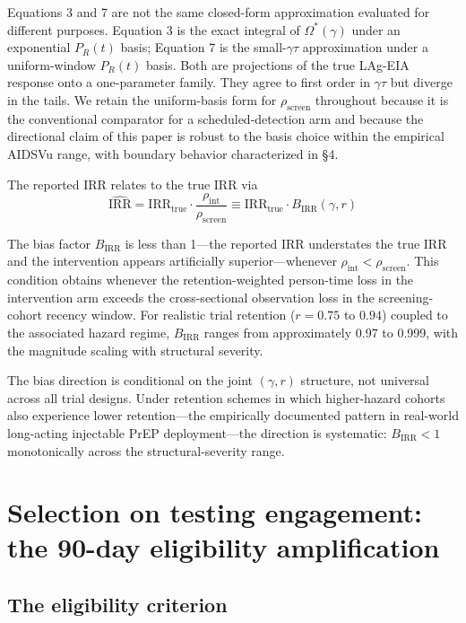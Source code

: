 \documentclass[12pt]{article}
\begin{document}
Equations 3 and 7 are not the same closed-form approximation evaluated for different purposes. Equation 3 is the exact integral of $\Omega^*(\gamma)$ under an exponential $P_R(t)$ basis; Equation 7 is the small-$\gamma\tau$ approximation under a uniform-window $P_R(t)$ basis. Both are projections of the true LAg-EIA response onto a one-parameter family. They agree to first order in $\gamma\tau$ but diverge in the tails. We retain the uniform-basis form for $\rho_{\mathrm{screen}}$ throughout because it is the conventional comparator for a scheduled-detection arm and because the directional claim of this paper is robust to the basis choice within the empirical AIDSVu range, with boundary behavior characterized in \S 4.

The reported IRR relates to the true IRR via
\begin{equation}
\widehat{\mathrm{IRR}} = \mathrm{IRR}_{\mathrm{true}} \cdot \frac{\rho_{\mathrm{int}}}{\rho_{\mathrm{screen}}} \equiv \mathrm{IRR}_{\mathrm{true}} \cdot B_{\mathrm{IRR}}(\gamma, r)
\end{equation}

The bias factor $B_{\mathrm{IRR}}$ is less than 1---the reported IRR understates the true IRR and the intervention appears artificially superior---whenever $\rho_{\mathrm{int}} < \rho_{\mathrm{screen}}$. This condition obtains whenever the retention-weighted person-time loss in the intervention arm exceeds the cross-sectional observation loss in the screening-cohort recency window. For realistic trial retention ($r = 0.75$ to $0.94$) coupled to the associated hazard regime, $B_{\mathrm{IRR}}$ ranges from approximately 0.97 to 0.999, with the magnitude scaling with structural severity.

The bias direction is conditional on the joint $(\gamma, r)$ structure, not universal across all trial designs. Under retention schemes in which higher-hazard cohorts also experience lower retention---the empirically documented pattern in real-world long-acting injectable PrEP deployment---the direction is systematic: $B_{\mathrm{IRR}} < 1$ monotonically across the structural-severity range.

\section{Selection on testing engagement: the 90-day eligibility amplification}

\subsection{The eligibility criterion}
\end{document}
